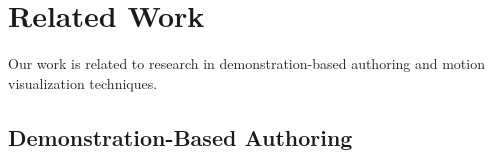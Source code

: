 \section{Related Work}
Our work is related to research in demonstration-based authoring and motion visualization techniques.

\subsection{Demonstration-Based Authoring}

